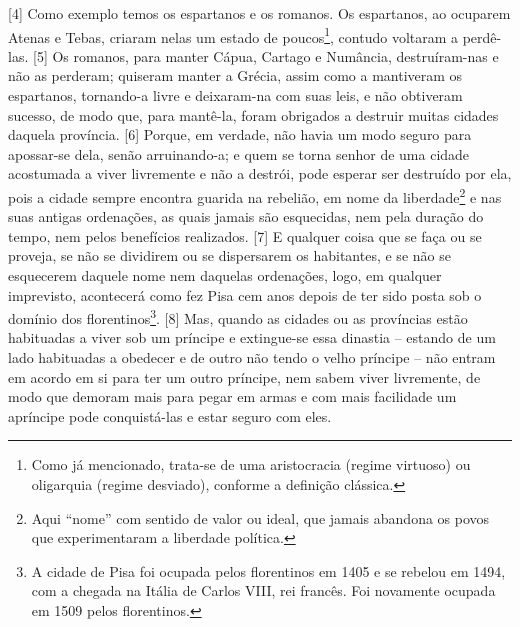 {[}4{]} Como exemplo temos os espartanos e os romanos. Os espartanos, ao
ocuparem Atenas e Tebas, criaram nelas um estado de poucos\footnote{Como
  já mencionado, trata-se de uma aristocracia (regime virtuoso) ou
  oligarquia (regime desviado), conforme a definição clássica.}, contudo
voltaram a perdê-las. {[}5{]} Os romanos, para manter Cápua, Cartago e
Numância, destruíram-nas e não as perderam; quiseram manter a Grécia,
assim como a mantiveram os espartanos, tornando-a livre e deixaram-na
com suas leis, e não obtiveram sucesso, de modo que, para mantê-la,
foram obrigados a destruir muitas cidades daquela província. {[}6{]}
Porque, em verdade, não havia um modo seguro para apossar-se dela, senão
arruinando-a; e quem se torna senhor de uma cidade acostumada a viver
livremente e não a destrói, pode esperar ser destruído por ela, pois a
cidade sempre encontra guarida na rebelião, em nome da
liberdade\footnote{Aqui ``nome'' com sentido de valor ou ideal, que
  jamais abandona os povos que experimentaram a liberdade política.} e
nas suas antigas ordenações, as quais jamais são esquecidas, nem pela
duração do tempo, nem pelos benefícios realizados. {[}7{]} E qualquer
coisa que se faça ou se proveja, se não se dividirem ou se dispersarem
os habitantes, e se não se esquecerem daquele nome nem daquelas
ordenações, logo, em qualquer imprevisto, acontecerá como fez Pisa cem
anos depois de ter sido posta sob o domínio dos florentinos\footnote{A
  cidade de Pisa foi ocupada pelos florentinos em 1405 e se rebelou em
  1494, com a chegada na Itália de Carlos VIII, rei francês. Foi
  novamente ocupada em 1509 pelos florentinos.}. {[}8{]} Mas, quando as
cidades ou as províncias estão habituadas a viver sob um príncipe e
extingue-se essa dinastia -- estando de um lado habituadas a obedecer e
de outro não tendo o velho príncipe -- não entram em acordo em si para
ter um outro príncipe, nem sabem viver livremente, de modo que demoram
mais para pegar em armas e com mais facilidade um apríncipe pode
conquistá-las e estar seguro com eles.

